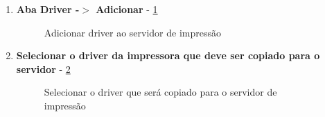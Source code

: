 \begin{enumerate}
	\item \textbf{Aba Driver -$>$ Adicionar} - \ref{adicionar_driver}
	\begin{figure}[ht]
	   	\centering
	   	\caption{Adicionar driver ao servidor de impressão}
	    \label{adicionar_driver}
	\end{figure}
	
	\item \textbf{Selecionar o driver da impressora que deve ser copiado para o servidor} - \ref{selecionar_driver}
	\begin{figure}[ht]
	   	\centering
	   	\caption{Selecionar o driver que será copiado para o servidor de impressão}
	    \label{selecionar_driver}
	\end{figure}
	

\end{enumerate}
